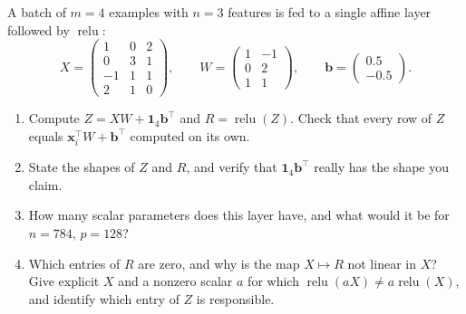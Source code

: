 
\begin{exercise}\label{ex:ml-1}
A batch of $m=4$ examples with $n=3$ features is fed to a single affine layer
followed by $\operatorname{relu}$:
\[
  X=\begin{pmatrix}1&0&2\\0&3&1\\-1&1&1\\2&1&0\end{pmatrix},\qquad
  W=\begin{pmatrix}1&-1\\0&2\\1&1\end{pmatrix},\qquad
  \mathbf{b}=\begin{pmatrix}0.5\\-0.5\end{pmatrix}.
\]
\begin{enumerate}[label=(\alph*)]
  \item Compute $Z=XW+\mathbf{1}_4\mathbf{b}^{\!\top}$ and $R=\operatorname{relu}(Z)$.
    Check that every row of $Z$ equals
    $\mathbf{x}_i^{\!\top}W+\mathbf{b}^{\!\top}$ computed on its own.
  \item State the shapes of $Z$ and $R$, and verify that
    $\mathbf{1}_4\mathbf{b}^{\!\top}$ really has the shape you claim.
  \item How many scalar parameters does this layer have, and what would it be
    for $n=784$, $p=128$?
  \item Which entries of $R$ are zero, and why is the map $X\mapsto R$ not
    linear in $X$? Give explicit $X$ and a nonzero scalar $a$ for which
    $\operatorname{relu}(aX)\ne a\operatorname{relu}(X)$, and identify which
    entry of $Z$ is responsible.
\end{enumerate}
\end{exercise}

